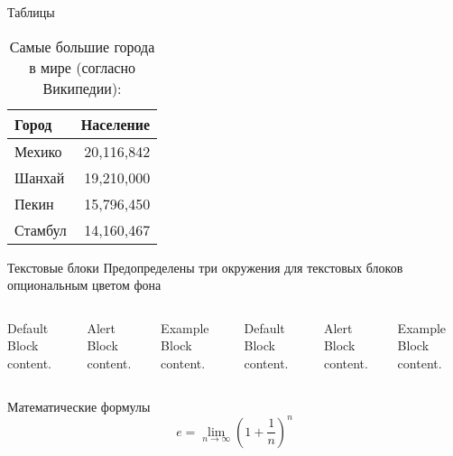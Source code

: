 \documentclass[12pt]{beamer}
\begin{document}
\begin{frame}{Таблицы}
  \begin{table}
    \caption{Самые большие города в мире (согласно Википедии):}
    \begin{tabular}{lr}
      \toprule
      Город & Население\\
      \midrule
      Мехико & 20,116,842\\
      Шанхай & 19,210,000\\
      Пекин & 15,796,450\\
      Стамбул & 14,160,467\\
      \bottomrule
    \end{tabular}
  \end{table}
\end{frame}
\begin{frame}{Текстовые блоки}
Предопределены три окружения для текстовых блоков  опциональным цветом фона

\begin{columns}[T,onlytextwidth]

\begin{block}{Default}
Block content.
\end{block}

\begin{alertblock}{Alert}
Block content.
\end{alertblock}

\begin{exampleblock}{Example}
Block content.
\end{exampleblock}


\begin{block}{Default}
Block content.
\end{block}

\begin{alertblock}{Alert}
Block content.
\end{alertblock}

\begin{exampleblock}{Example}
Block content.
\end{exampleblock}
\end{columns}
\end{frame}


\begin{frame}{Математические формулы}
  \begin{equation*}
    e = \lim_{n\to \infty} \left(1 + \frac{1}{n}\right)^n
  \end{equation*}
\end{frame}
\end{document}
